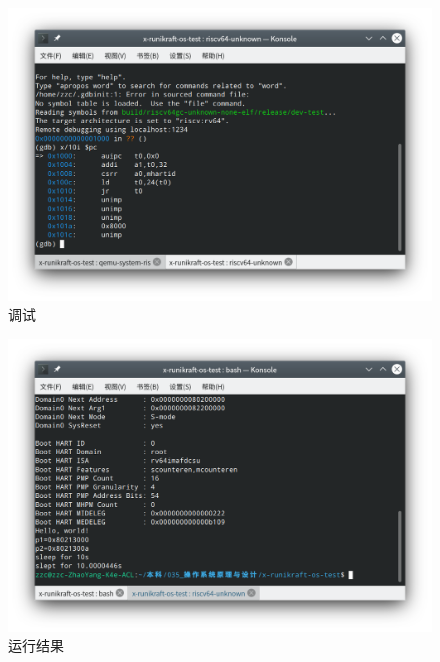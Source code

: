 \documentclass{../runikraft-report}
\begin{document}
\begin{figure}[tbh!]
\centering
\vspace*{-3ex}
\includegraphics[width=0.9\linewidth]{assets/debug.png}
\vspace*{-3ex}
\caption{调试}
\label{fig:debug}
\end{figure}

\begin{figure}[tbh!]
\centering
\vspace*{-3ex}
\includegraphics[width=0.9\linewidth]{assets/run.png}
\vspace*{-3ex}
\caption{运行结果}
\label{fig:run}
\end{figure}
\end{document}
